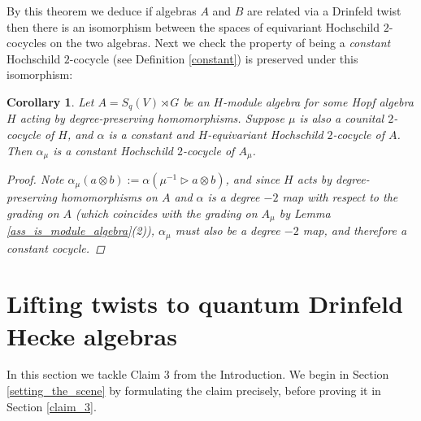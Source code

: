 \documentclass[10pt]{article}
\newcommand{\nt}{\noindent}
\newcommand{\al}{\alpha}
\newtheorem{cor}[lemma]{Corollary}
\theoremstyle{definition}
\begin{document}
\nt By this theorem we deduce if algebras $A$ and $B$ are related via a Drinfeld twist then there is an isomorphism between the spaces of equivariant Hochschild $2$-cocycles on the two algebras. Next we check the property of being a \textit{constant} Hochschild $2$-cocycle (see Definition \ref{constant}) is preserved under this isomorphism:

\begin{cor} Let $A=S_q(V)\rtimes G$ be an $H$-module algebra for some Hopf algebra $H$ acting by degree-preserving homomorphisms. Suppose $\mu$ is also a counital $2$-cocycle of $H$, and $\alpha$ is a constant and $H$-equivariant Hochschild $2$-cocycle of $A$. Then $\alpha_\mu$ is a constant Hochschild $2$-cocycle of $A_\mu$.
\begin{proof}
Note $\al_\mu(a\otimes b):=\al(\mu^{-1}\rhd a\otimes b)$, and since $H$ acts by degree-preserving homomorphisms on $A$ and $\alpha$ is a degree $-2$ map with respect to the grading on $A$ (which coincides with the grading on $A_\mu$ by Lemma \ref{ass_is_module_algebra}(2)), $\al_\mu$ must also be a degree $-2$ map, and therefore a constant cocycle.
\end{proof}
\end{cor}




\section{Lifting twists to quantum Drinfeld Hecke algebras}\label{claim_3_sec}
In this section we tackle Claim 3 from the Introduction. We begin in Section \ref{setting_the_scene} by formulating the claim precisely, before proving it in Section \ref{claim_3}.
\end{document}
